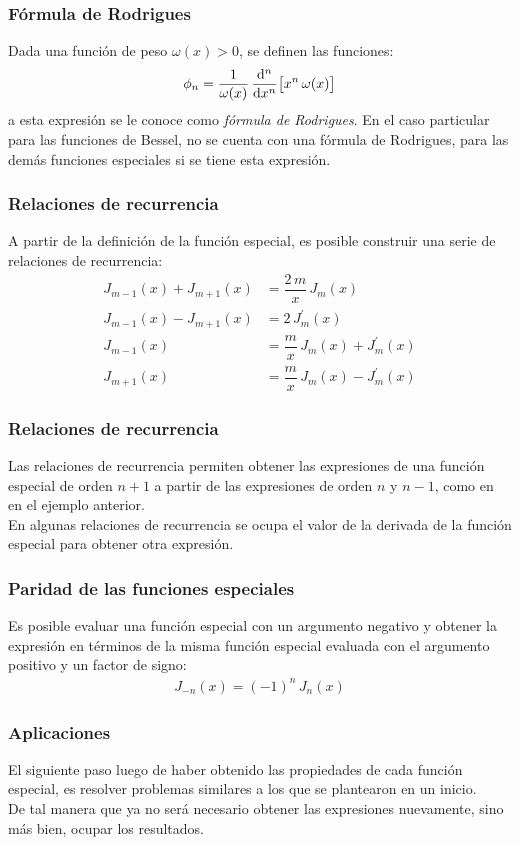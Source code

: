 \documentclass[12pt]{beamer}
\begin{document}
\begin{frame}
\frametitle{Fórmula de Rodrigues}
Dada una función de peso $\omega(x) > 0$, se definen las funciones:
\pause
\begin{align*}
\phi_{n} = \dfrac{1}{\omega(x)} \, \dv[n]{x} \big[ x^{n} \, \omega(x) \big]
\end{align*}
a esta expresión se le conoce como \emph{fórmula de Rodrigues}. \pause En el caso particular para las funciones de Bessel, no se cuenta con una fórmula de Rodrigues, para las demás funciones especiales si se tiene esta expresión.
\end{frame}
\begin{frame}
\frametitle{Relaciones de recurrencia}
A partir de la definición de la función especial, es posible construir una serie de relaciones de recurrencia:
\begin{align*}
J_{m-1} (x) + J_{m+1} (x) &= \dfrac{2 \, m}{x} \, J_{m} (x) \\[0.5em]
J_{m-1} (x) - J_{m+1} (x) &= 2 \, J_{m}^{\prime} (x) \\[0.5em]
J_{m-1}(x) &= \dfrac{m}{x} \, J_{m} (x) + J_{m}^{\prime} (x) \\[0.5em]
J_{m+1}(x) &= \dfrac{m}{x} \, J_{m} (x) - J_{m}^{\prime} (x)
\end{align*}
\end{frame}
\begin{frame}
\frametitle{Relaciones de recurrencia}
Las relaciones de recurrencia permiten obtener las expresiones de una función especial de orden $n + 1$ a partir de las expresiones de orden $n$ y $n - 1$, como en en el ejemplo anterior.
\pause
\\
\bigskip
En algunas relaciones de recurrencia se ocupa el valor de la derivada de la función especial para obtener otra expresión.
\end{frame}
\begin{frame}
\frametitle{Paridad de las funciones especiales}
Es posible evaluar una función especial con un argumento negativo y obtener la expresión en términos de la misma función especial evaluada con el argumento positivo y un factor de signo:
\pause
\begin{align*}
J_{-n} (x) = (-1)^{n} \, J_{n}(x)
\end{align*}
\end{frame}
\begin{frame}
\frametitle{Aplicaciones}
El siguiente paso luego de haber obtenido las propiedades de cada función especial, es resolver problemas similares a los que se plantearon en un inicio.
\\
\bigskip
De tal manera que ya no será necesario obtener las expresiones nuevamente, sino más bien, ocupar los resultados.
\end{frame}
\end{document}
